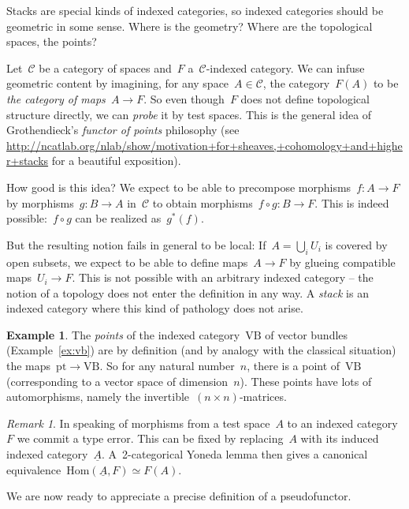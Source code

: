 \documentclass[a4paper,english,12pt]{scrartcl}
\theoremstyle{definition}
\newtheorem{ex}[defn]{Example}
\theoremstyle{plain}
\theoremstyle{remark}
\newtheorem{rem}[defn]{Remark}
\newcommand{\C}{\mathcal{C}}
\newcommand{\VB}{\mathrm{VB}}
\newcommand{\pt}{\mathrm{pt}}
\newcommand{\Hom}{\mathrm{Hom}}
\newcommand{\ul}[1]{\underline{#1}}
\begin{document}
Stacks are special kinds of indexed categories, so indexed categories should
be geometric in some sense. Where is the geometry? Where are the topological spaces, the
points?

Let~$\C$ be a category of spaces and~$F$ a~$\C$-indexed category. We
can infuse geometric content by imagining, for any space~$A \in \C$, the
category~$F(A)$ to be \emph{the category of maps~$A \to F$}. So even though~$F$
does not define topological structure directly, we can \emph{probe} it by test
spaces. This is the general idea of Grothendieck's \emph{functor of points}
philosophy (see
\url{http://ncatlab.org/nlab/show/motivation+for+sheaves,+cohomology+and+higher+stacks}
for a beautiful exposition).

How good is this idea? We expect to be able to precompose morphisms~$f : A \to F$
by morphisms~$g : B \to A$ in~$\C$ to obtain morphisms~$f \circ g : B \to F$.
This is indeed possible:~$f \circ g$ can be realized as~$g^*(f)$.

But the resulting notion fails in general to be local: If~$A = \bigcup_i U_i$
is covered by open subsets, we expect to be able to define maps~$A \to F$ by
glueing compatible maps~$U_i \to F$. This is not possible with an arbitrary
indexed category -- the notion of a topology does not enter the definition in
any way. A \emph{stack} is an indexed category where this kind of pathology does not
arise.

\begin{ex}The \emph{points} of the indexed category~$\VB$ of vector bundles
(Example~\ref{ex:vb}) are by definition (and by analogy with the classical
situation) the maps~$\pt \to \VB$. So for any natural number~$n$, there is a point
of~$\VB$ (corresponding to a vector space of dimension~$n$). These points
have lots of automorphisms, namely the invertible~$(n \times n)$-matrices.
\end{ex}

\begin{rem}In speaking of morphisms from a test space~$A$ to an indexed
category~$F$ we commit a type error. This can be fixed by replacing~$A$ with
its induced indexed category~$\ul{A}$. A~2-categorical Yoneda lemma then gives
a canonical equivalence~$\Hom(\ul{A},F) \simeq F(A)$.
\end{rem}

We are now ready to appreciate a precise definition of a pseudofunctor.
\end{document}
